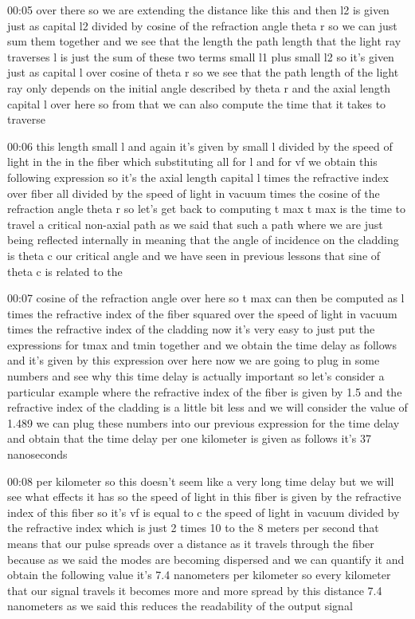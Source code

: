 00:05
over there so we are extending the distance like this
and then l2 is given just as capital l2 divided by cosine
of the refraction angle theta r so we can just sum them together and we see
that the length the path length that the
light ray traverses l is just the sum of these two terms small l1 plus small l2
so it's given just as capital l over cosine of theta r so we see
that the path length of the light ray only depends on the initial angle
described by theta r and the axial length capital l over here
so from that we can also compute the time that it takes to traverse

00:06
this length small l and again it's given by
small l divided by the speed of light in the in the fiber which substituting
all for l and for vf we obtain this following expression
so it's the axial length capital l times the refractive index
over fiber all divided by the speed of light in vacuum
times the cosine of the refraction angle theta r
so let's get back to computing t max t max is the time to travel a critical
non-axial path as we said that such a path where
we are just being reflected internally in meaning that the angle of incidence
on the cladding is theta c our critical angle
and we have seen in previous lessons that sine of theta c is related to the

00:07
cosine of the refraction angle over here so t max can then be computed as l
times the refractive index of the fiber squared
over the speed of light in vacuum times the refractive index of the cladding
now it's very easy to just put the expressions for tmax and tmin together
and we obtain the time delay as follows and it's given by this expression over
here now we are going to plug in some numbers and see why this
time delay is actually important so let's consider a particular example
where the refractive index of the fiber is given by
1.5 and the refractive index of the cladding is a little bit less and we will
consider the value of 1.489 we can plug these numbers into our
previous expression for the time delay and obtain that the time delay per one
kilometer is given as follows it's 37 nanoseconds

00:08
per kilometer so this doesn't seem like a very long time delay
but we will see what effects it has so the speed of light in this fiber is given
by the refractive index of this fiber so it's vf is equal to
c the speed of light in vacuum divided by the refractive index
which is just 2 times 10 to the 8 meters per second
that means that our pulse spreads over a distance as it travels through
the fiber because as we said the modes are becoming dispersed
and we can quantify it and obtain the following value
it's 7.4 nanometers per kilometer so every kilometer that our signal travels
it becomes more and more spread by this distance 7.4 nanometers
as we said this reduces the readability of the output signal

